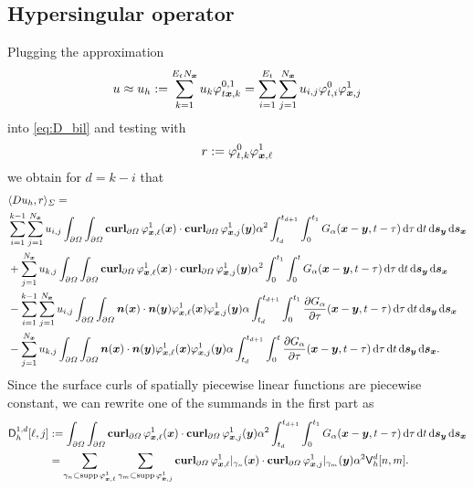 \documentclass[a4paper,11pt]{article}
\begin{document}
\subsection{Hypersingular operator}

Plugging the approximation
\begin{equation*}
 u \approx u_h := \sum_{k=1}^{E_t N_{{\bm{x}}}} u_k \varphi^{0,1}_{t{{\bm{x}}},k} = \sum_{i=1}^{E_t} \sum_{j=1}^{N_{{\bm{x}}}} u_{i,j} \varphi^0_{t,i} \varphi^1_{{{\bm{x}}},j}
\end{equation*}
into \eqref{eq:D_bil} and testing with
\begin{equation*}
  r := \varphi^0_{t,k} \varphi^1_{{{\bm{x}}},\ell}
\end{equation*}
we obtain for $d=k-i$ that
\begin{align*}
  &\langle Du_h, r \rangle_\Sigma = \\ 
  &\sum_{i=1}^{k-1} \sum_{j=1}^{N_{{\bm{x}}}} u_{i,j}\int_{\partial\Omega} \int_{\partial\Omega} \operatorname{\mathbf{curl}}_{\partial\Omega} \varphi^1_{{{\bm{x}}},\ell}({{\bm{x}}}) \cdot \operatorname{\mathbf{curl}}_{\partial\Omega} \varphi^1_{{{\bm{x}}},j}({{\bm{y}}}) \alpha^2 \int_{t_{d}}^{t_{d+1}} \int_{0}^{t_1} G_\alpha({{\bm{x}}}-{{\bm{y}}},t-\tau) \,{\mathrm{d}}\tau \,{\mathrm{d}} t \,{\mathrm{d}}{{\bm{s}}}_{{\bm{y}}} \,{\mathrm{d}}{{\bm{s}}}_{{\bm{x}}} \\
    &+\sum_{j=1}^{N_{{\bm{x}}}} u_{k,j}\int_{\partial\Omega} \int_{\partial\Omega} \operatorname{\mathbf{curl}}_{\partial\Omega} \varphi^1_{{{\bm{x}}},\ell}({{\bm{x}}}) \cdot \operatorname{\mathbf{curl}}_{\partial\Omega} \varphi^1_{{{\bm{x}}},j}({{\bm{y}}}) \alpha^2 \int_{0}^{t_1} \int_{0}^{t} G_\alpha({{\bm{x}}}-{{\bm{y}}},t-\tau) \,{\mathrm{d}}\tau \,{\mathrm{d}} t \,{\mathrm{d}}{{\bm{s}}}_{{\bm{y}}} \,{\mathrm{d}}{{\bm{s}}}_{{\bm{x}}} \\
  &- \sum_{i=1}^{k-1} \sum_{j=1}^{N_{{\bm{x}}}} u_{i,j} \int_{\partial\Omega} \int_{\partial\Omega} {{\bm{n}}}({{\bm{x}}}) \cdot {\ensuremath{{\bm{n}}}}({{\bm{y}}}) \varphi^1_{{{\bm{x}}},\ell}({{\bm{x}}}) \varphi^1_{{{\bm{x}}},j}({{\bm{y}}}) \alpha \int_{t_d}^{t_{d+1}} \int_0^{t_1} \frac{\partial G_\alpha}{\partial \tau}({{\bm{x}}}-{{\bm{y}}},t-\tau) \,{\mathrm{d}}\tau \,{\mathrm{d}} t \,{\mathrm{d}}{{\bm{s}}}_{{\bm{y}}} \,{\mathrm{d}}{{\bm{s}}}_{{\bm{x}}} \\
    &- \sum_{j=1}^{N_{{\bm{x}}}} u_{k,j} \int_{\partial\Omega} \int_{\partial\Omega} {{\bm{n}}}({{\bm{x}}}) \cdot {\ensuremath{{\bm{n}}}}({{\bm{y}}}) \varphi^1_{{{\bm{x}}},\ell}({{\bm{x}}}) \varphi^1_{{{\bm{x}}},j}({{\bm{y}}}) \alpha \int_{t_d}^{t_{d+1}} \int_0^{t} \frac{\partial G_\alpha}{\partial \tau}({{\bm{x}}}-{{\bm{y}}},t-\tau) \,{\mathrm{d}}\tau \,{\mathrm{d}} t \,{\mathrm{d}}{{\bm{s}}}_{{\bm{y}}} \,{\mathrm{d}}{{\bm{s}}}_{{\bm{x}}}.
\end{align*}
Since the surface curls of spatially piecewise linear functions are piecewise constant, we can rewrite one of the summands in the first part as
\begin{align*}
  {\ensuremath{{\mathsf{D}}}}^{1,d}_h[\ell,j] &:= \int_{\partial\Omega} \int_{\partial\Omega}\operatorname{\mathbf{curl}}_{\partial\Omega} \varphi^1_{{{\bm{x}}},\ell}({{\bm{x}}}) \cdot \operatorname{\mathbf{curl}}_{\partial\Omega} \varphi^1_{{{\bm{x}}},j}({{\bm{y}}}) \alpha^2 \int_{t_{d}}^{t_{d+1}} \int_{0}^{t_1} G_\alpha({{\bm{x}}}-{{\bm{y}}},t-\tau) \,{\mathrm{d}}\tau \,{\mathrm{d}} t \,{\mathrm{d}}{{\bm{s}}}_{{\bm{y}}} \,{\mathrm{d}}{{\bm{s}}}_{{\bm{x}}} \\
  &= \sum_{\gamma_n \subset \operatorname{supp} \varphi^1_{{{\bm{x}}},\ell}} \sum_{\gamma_m \subset \operatorname{supp} \varphi^1_{{{\bm{x}}},j}} \operatorname{\mathbf{curl}}_{\partial\Omega} \varphi^1_{{{\bm{x}}},\ell}|_{\gamma_n}({{\bm{x}}}) \cdot \operatorname{\mathbf{curl}}_{\partial\Omega} \varphi^1_{{{\bm{x}}},j}|_{\gamma_m}({{\bm{y}}}) \alpha^2 {{\mathsf{V}}}_h^d[n,m].
\end{align*}
\end{document}
